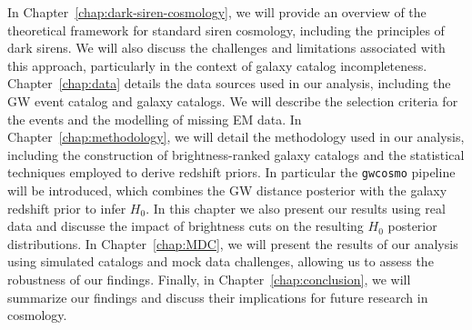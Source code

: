 In Chapter~\ref{chap:dark-siren-cosmology}, we will provide an overview of the theoretical framework for standard siren cosmology, including the principles of dark sirens. We will also discuss the challenges and limitations associated with this approach, particularly in the context of galaxy catalog incompleteness. Chapter~\ref{chap:data} details the data sources used in our analysis, including the \ac{GW} event catalog and galaxy catalogs. We will describe the selection criteria for the events and the modelling of missing \ac{EM} data. In Chapter~\ref{chap:methodology}, we will detail the methodology used in our analysis, including the construction of brightness-ranked galaxy catalogs and the statistical techniques employed to derive redshift priors. In particular the \texttt{gwcosmo} pipeline will be introduced, which combines the \ac{GW} distance posterior with the galaxy redshift prior to infer $H_0$. In this chapter we also present our results using real data and discusse the impact of brightness cuts on the resulting $H_0$ posterior distributions. In Chapter~\ref{chap:MDC}, we will present the results of our analysis using simulated catalogs and mock data challenges, allowing us to assess the robustness of our findings. Finally, in Chapter~\ref{chap:conclusion}, we will summarize our findings and discuss their implications for future research in cosmology.
